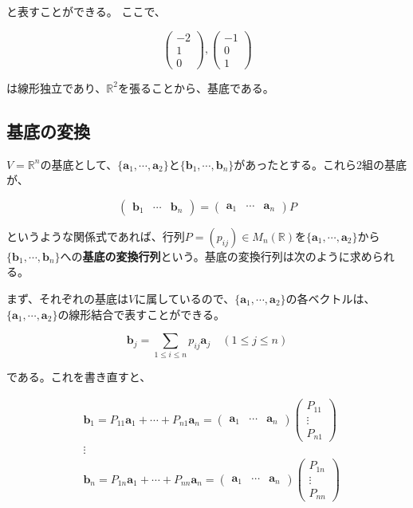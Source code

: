 \documentclass[dvipdfmx,autodetect-engine]{jsarticle}
\theoremstyle{definition}
\newcommand{\vecSpace}[1]{\mathbb{R}^{#1}}
\begin{document}
と表すことができる。
ここで、

$$
\begin{pmatrix}
-2 \\
1 \\
0
\end{pmatrix}, \begin{pmatrix}
-1 \\
0 \\
1
\end{pmatrix} 
$$

は線形独立であり、$\vecSpace{2}$を張ることから、基底である。

\subsection{基底の変換}

$V = \vecSpace{n}$の基底として、$\{\bm{a}_1, \cdots, \bm{a}_2\}$と$\{\bm{b}_1, \cdots, \bm{b}_n\}$があったとする。これら2組の基底が、

$$
\begin{pmatrix}
\bm{b}_1 & \cdots & \bm{b}_n
\end{pmatrix} =
\begin{pmatrix}
\bm{a}_1 & \cdots & \bm{a}_n
\end{pmatrix}P
$$

というような関係式であれば、行列$P = (p_{ij}) \in M_n(\mathbb{R})$を$\{\bm{a}_1, \cdots, \bm{a}_2\}$から$\{\bm{b}_1, \cdots, \bm{b}_n\}$への{\bf 基底の変換行列}という。基底の変換行列は次のように求められる。

まず、それぞれの基底は$V$に属しているので、$\{\bm{a}_1, \cdots, \bm{a}_2\}$の各ベクトルは、$\{\bm{a}_1, \cdots, \bm{a}_2\}$の線形結合で表すことができる。

$$
\bm{b}_j = \sum_{1 \leq i \leq n} p_{ij}\bm{a}_j \quad (1 \leq j \leq n)
$$

である。これを書き直すと、

\begin{eqnarray*}
&\bm{b}_1 = P_{11}\bm{a}_1 + \cdots + P_{n1}\bm{a}_n = 
\begin{pmatrix}
\bm{a}_1 & \cdots & \bm{a}_n
\end{pmatrix}
\begin{pmatrix}
P_{11} \\
\vdots \\
P_{n1}
\end{pmatrix} \\
&\vdots \\
&\bm{b}_n = P_{1n}\bm{a}_1 + \cdots + P_{nn}\bm{a}_n = 
\begin{pmatrix}
\bm{a}_1 & \cdots & \bm{a}_n
\end{pmatrix}
\begin{pmatrix}
P_{1n} \\
\vdots \\
P_{nn}
\end{pmatrix}
\end{eqnarray*}
\end{document}
